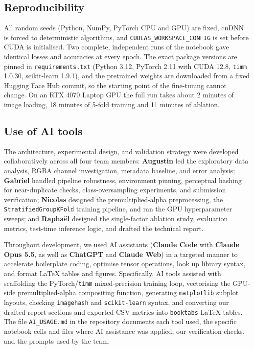 \documentclass[11pt,a4paper]{article}
\newcommand{\code}[1]{\texttt{\small #1}}
\begin{document}
\subsection{Reproducibility}
All random seeds (Python, NumPy, PyTorch CPU and GPU) are fixed, cuDNN is forced to deterministic
algorithms, and \code{CUBLAS\_WORKSPACE\_CONFIG} is set before CUDA is initialised. Two complete,
independent runs of the notebook gave identical losses and accuracies at every epoch. The exact package
versions are pinned in \code{requirements.txt} (Python 3.12, PyTorch 2.11 with CUDA 12.8, \code{timm}
1.0.30, scikit-learn 1.9.1), and the pretrained weights are downloaded from a fixed Hugging Face Hub
commit, so the starting point of the fine-tuning cannot change. On an RTX 4070 Laptop GPU the full run takes about 2 minutes of image
loading, 18 minutes of 5-fold training and 11 minutes of ablation.

\subsection{Use of AI tools}
\label{sec:ai}

The architecture, experimental design, and validation strategy were developed collaboratively across all
four team members: \textbf{Augustin} led the exploratory data analysis, RGBA channel investigation,
metadata baseline, and error analysis; \textbf{Gabriel} handled pipeline robustness, environment pinning,
perceptual hashing for near-duplicate checks, class-oversampling experiments, and submission verification;
\textbf{Nicolas} designed the premultiplied-alpha preprocessing, the \code{StratifiedGroupKFold} training
pipeline, and ran the GPU hyperparameter sweeps; and \textbf{Raphaël} designed the single-factor ablation
study, evaluation metrics, test-time inference logic, and drafted the technical report.

Throughout development, we used AI assistants (\textbf{Claude Code} with \textbf{Claude Opus 5.5}, as well
as \textbf{ChatGPT} and \textbf{Claude Web}) in a targeted manner to accelerate boilerplate coding,
optimise tensor operations, look up library syntax, and format LaTeX tables and figures. Specifically, AI
tools assisted with scaffolding the PyTorch/\code{timm} mixed-precision training loop, vectorising the
GPU-side premultiplied-alpha compositing function, generating \code{matplotlib} subplot layouts, checking
\code{imagehash} and \code{scikit-learn} syntax, and converting our drafted report sections and exported
CSV metrics into \code{booktabs} LaTeX tables. The file \code{AI\_USAGE.md} in the repository documents
each tool used, the specific notebook cells and files where AI assistance was applied, our verification
checks, and the prompts used by the team.
\end{document}
